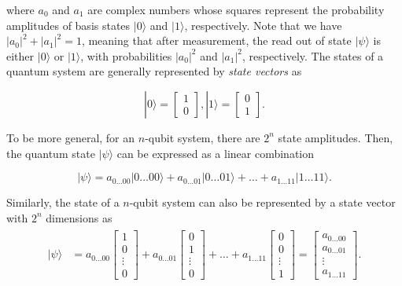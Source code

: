 \noindent where $a_0$ and $a_1$ are complex numbers whose squares represent the probability amplitudes of basis states $|0\rangle$ and $|1\rangle$, respectively. Note that we have $|a_0|^2 + |a_1|^2 = 1$, meaning that after measurement, the read out of state $|\psi\rangle$ is either $|0\rangle$ or $|1\rangle$, with probabilities $|a_0|^2$ and $|a_1|^2$, respectively. The states of a quantum system are generally represented by \textit{state vectors} as

\begin{equation}%
|0\rangle = \begin{bmatrix} 1 \\ 0 \end{bmatrix}, |1\rangle = \begin{bmatrix} 0 \\ 1 \end{bmatrix}.
\label{eq-2}
\end{equation}

\par To be more general, for an $n$-qubit system, there are $2^n$ state amplitudes. Then, the quantum state $|\psi\rangle$ can be expressed as a linear combination

\begin{equation}%
|\psi\rangle = a_{0\dots00}|0\dots00\rangle + a_{0\dots01}|0\dots01\rangle + \dots + a_{1\dots11}|1\dots11\rangle.
\label{eq-3}
\end{equation}

\noindent Similarly, the state of a $n$-qubit system can also be represented by a state vector with $2^n$ dimensions as
\begin{align}%
\begin{split}
|\psi\rangle & = a_{0\dots00}\begin{bmatrix} 1 \\ 0 \\ \vdots \\ 0 \end{bmatrix} + a_{0\dots01}\begin{bmatrix} 0 \\ 1 \\ \vdots \\ 0 \end{bmatrix} + \dots + a_{1\dots11}\begin{bmatrix} 0 \\ 0 \\ \vdots \\ 1 \end{bmatrix} =\begin{bmatrix} a_{0\dots00} \\ a_{0\dots01} \\ \vdots \\ a_{1\dots11} \end{bmatrix}.
\label{eq-4}
\end{split}
\end{align}

